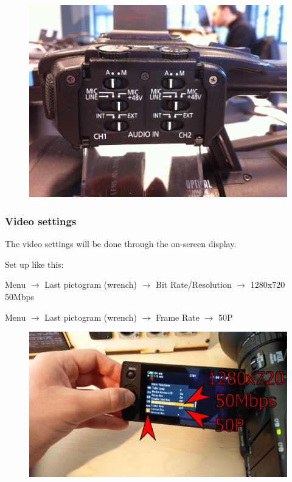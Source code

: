 \documentclass{article}
\begin{document}
\begin{figure}[H]
  \centering
\includegraphics[width = 120mm]{canon_audio_settings.jpg}
\end{figure}

\subsubsection{Video settings}
The video settings will be done through the on-screen display.

Set up like this:

Menu $\rightarrow$ Last pictogram (wrench) $\rightarrow$ Bit Rate/Resolution $\rightarrow$ 1280x720 50Mbps

Menu $\rightarrow$ Last pictogram (wrench) $\rightarrow$ Frame Rate $\rightarrow$ 50P

\begin{figure}[H]
  \centering
\includegraphics[width = 120mm]{Canon05.jpg}
\end{figure}
\end{document}
